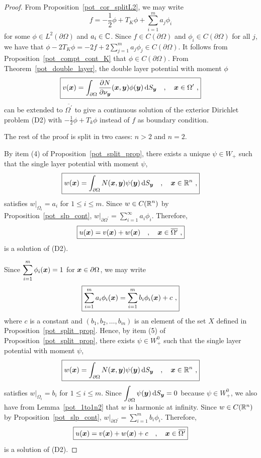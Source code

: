 \begin{proof}
  From Proposition~\ref{pot_cor_splitL2}, we may write
\[
\boxed{
f = - \frac{1}{2} \phi + T_K \phi + \sum_{i=1}^m a_j \phi_i
}
\]
for some $\displaystyle \phi \in L^2(\partial \Omega)$ and $a_i \in \mathbb{C}$.
Since $f\in C(\partial \Omega)$ and $\phi_i \in C(\partial \Omega)$
for all $j$, we have that
$\displaystyle
\phi -2 T_K \phi = -2f + 2 \sum_{j=1}^m a_j \phi_j \in C(\partial \Omega)$.
It follows from Proposition~\ref{pot_compt_cont_K} that
$\phi \in C(\partial \Omega)$.  From Theorem~\ref{pot_double_layer},
the double layer potential with moment $\phi$
\[
\boxed{
v({\bm{x}}) = \int_{\partial \Omega}
\frac{\partial{N}}{\partial \nu_{{\bm{y}}}}({\bm{x}},{\bm{y}}) \phi({\bm{y}})
\,\mathrm{d}{S}_{{\bm{y}}} \quad , \quad {\bm{x}} \in \Omega^{\prime} \ ,
}
\]
can be extended to $\overline{\Omega^{\prime}}$ to give a continuous
solution of the exterior Dirichlet problem (D2) with
$\displaystyle -\frac{1}{2} \phi + T_k \phi$ instead of $f$ as boundary
condition.

The rest of the proof is split in two cases: $n>2$ and $n=2$.

By item (4) of Proposition~\ref{pot_split_prop}, there
exists a unique $\psi \in W_+$ such that the single layer potential
with moment $\psi$,
\[
\boxed{
w({\bm{x}}) = \int_{\partial \Omega} N({\bm{x}},{\bm{y}})
\psi({\bm{y}}) \,\mathrm{d}{S}_{{\bm{y}}} \quad , \quad {\bm{x}} \in \mathbb{R}^n \ ,
}
\]
satisfies $\displaystyle w\big|_{\Omega_i} = a_i$ for
$1\leq i \leq m$.
Since $\displaystyle w \in C(\mathbb{R}^n)$ by Proposition~\ref{pot_slp_cont},
$\displaystyle 
w\big|_{\partial \Omega^{\prime}} = \sum_{i=1}^\infty a_i \phi_i$.
Therefore,
\[
\boxed{
u({\bm{x}}) = v({\bm{x}}) + w({\bm{x}}) \quad , \quad {\bm{x}} \in
\overline{\Omega^{\prime}} \ ,
}
\]
is a solution of (D2).

Since
$\displaystyle \sum_{i=1}^m \phi_i({\bm{x}}) = 1$ for
${\bm{x}} \in \partial \Omega$, we may write
\[
\boxed{
\sum_{i=1}^m a_i \phi_i({\bm{x}}) = \sum_{i=1}^m b_i \phi_i({\bm{x}}) + c \ ,
}
\]
where $c$ is a constant and $(b_1,b_2, \ldots, b_m)$ is an element of
the set $X$ defined in Proposition~\ref{pot_split_prop}.  Hence, by
item (5) of Proposition~\ref{pot_split_prop}, there
exists $\displaystyle \psi \in W_+^0$ such that the single layer
potential with moment $\psi$,
\[
\boxed{
w({\bm{x}}) = \int_{\partial \Omega} N({\bm{x}},{\bm{y}})
\psi({\bm{y}}) \,\mathrm{d}{S}_{{\bm{y}}} \quad , \quad {\bm{x}} \in \mathbb{R}^n \  ,
}
\]
satisfies $\displaystyle w\big|_{\Omega_i} = b_i$ for
$1\leq i \leq m$.  Since
$\displaystyle \int_{\partial \Omega} \psi({\bm{y}}) \,\mathrm{d}{S}_{{\bm{y}}} = 0$
because $\psi\in W_+^0$, we also have from Lemma~\ref{pot_1to1n2} that
$w$ is harmonic at infinity.  Since $w \in C(\mathbb{R}^n)$ by
Proposition~\ref{pot_slp_cont},
$\displaystyle 
w\big|_{\partial \Omega^{\prime}} = \sum_{i=1}^m b_i \phi_i$.
Therefore,
\[
\boxed{
u({\bm{x}}) = v({\bm{x}}) + w({\bm{x}}) + c \quad , \quad {\bm{x}} \in
\overline{\Omega^{\prime}}
}
\]
is a solution of (D2).
\end{proof}

